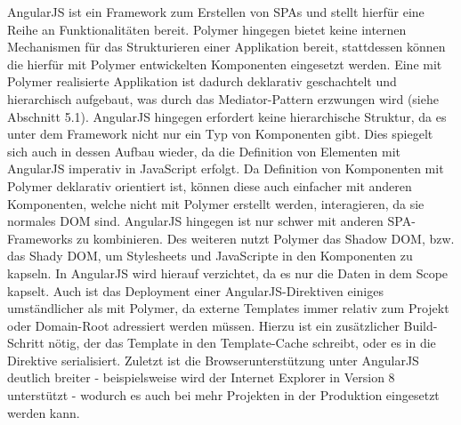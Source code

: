 AngularJS ist ein Framework zum Erstellen von \ac{SPA}s und stellt hierfür eine Reihe an Funktionalitäten bereit. Polymer hingegen bietet keine internen Mechanismen für das Strukturieren einer Applikation bereit, stattdessen können die hierfür mit Polymer entwickelten Komponenten eingesetzt werden. Eine mit Polymer realisierte Applikation ist dadurch deklarativ geschachtelt und hierarchisch aufgebaut, was durch das Mediator-Pattern erzwungen wird (siehe Abschnitt 5.1). AngularJS hingegen erfordert keine hierarchische Struktur, da es unter dem Framework nicht nur ein Typ von Komponenten gibt. Dies spiegelt sich auch in dessen Aufbau wieder, da die Definition von Elementen mit AngularJS imperativ in JavaScript erfolgt. Da Definition von Komponenten mit Polymer deklarativ orientiert ist, können diese auch einfacher mit anderen Komponenten, welche nicht mit Polymer erstellt werden, interagieren, da sie normales \ac{DOM} sind. AngularJS hingegen ist nur schwer mit anderen \ac{SPA}-Frameworks zu kombinieren. Des weiteren nutzt Polymer das Shadow \ac{DOM}, bzw. das Shady \ac{DOM}, um Stylesheets und JavaScripte in den Komponenten zu kapseln. In AngularJS wird hierauf verzichtet, da es nur die Daten in dem Scope kapselt. Auch ist das Deployment einer AngularJS-Direktiven einiges umständlicher als mit Polymer, da externe Templates immer relativ zum Projekt oder Domain-Root adressiert werden müssen. Hierzu ist ein zusätzlicher Build-Schritt nötig, der das Template in den Template-Cache schreibt, oder es in die Direktive serialisiert. Zuletzt ist die Browserunterstützung unter AngularJS deutlich breiter - beispielsweise wird der Internet Explorer in Version 8 unterstützt - wodurch es auch bei mehr Projekten in der Produktion eingesetzt werden kann.
